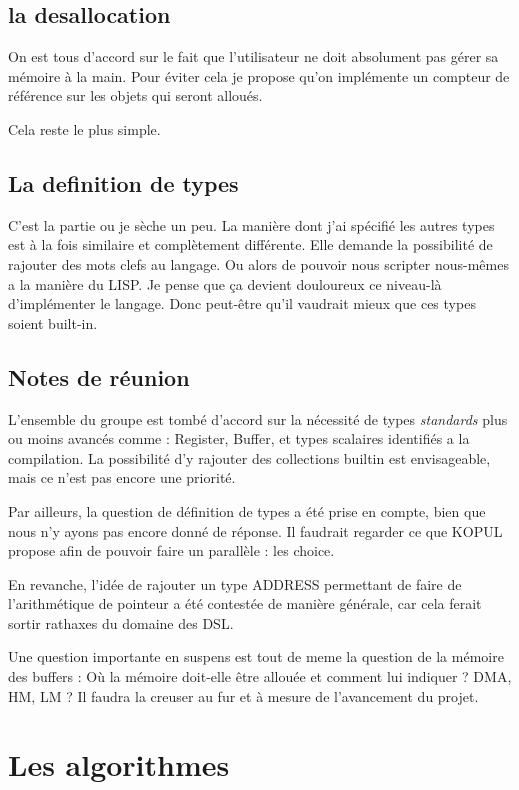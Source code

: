 \documentclass{rtxreport}
\begin{document}
\section{la desallocation}
On est tous d’accord sur le fait que l’utilisateur ne doit absolument pas gérer
sa mémoire à la main. Pour éviter cela je propose qu’on implémente un compteur
de référence sur les objets qui seront alloués.

Cela reste le plus simple.

\section{La definition de types}
C’est la partie ou je sèche un peu. La manière dont j’ai spécifié les autres
types est à la fois similaire et complètement différente. Elle demande la
possibilité de rajouter des mots clefs au langage. Ou alors de pouvoir nous
scripter nous-mêmes a la manière du LISP. Je pense que ça devient douloureux
ce niveau-là d’implémenter le langage. Donc peut-être qu’il vaudrait mieux que
ces types soient built-in.

\section{Notes de réunion}
L'ensemble du groupe est tombé d'accord sur la nécessité de types
\emph{standards} plus ou moins avancés comme : Register, Buffer, et types
scalaires identifiés a la compilation.
La possibilité d'y rajouter des collections builtin est envisageable, mais ce
n'est pas encore une priorité.

Par ailleurs, la question de définition de types a été prise en compte,
bien que nous n'y ayons pas encore donné de réponse. Il faudrait regarder ce
que KOPUL propose afin de pouvoir faire un parallèle : les choice.

En revanche, l'idée de rajouter un type ADDRESS permettant de faire de
l'arithmétique de pointeur a été contestée de manière générale, car cela ferait
sortir rathaxes du domaine des DSL.

Une question importante en suspens est tout de meme la question de la mémoire
des buffers : Où la mémoire doit-elle être allouée et comment lui indiquer ?
DMA, HM, LM ? Il faudra la creuser au fur et à mesure de l'avancement du
projet.



\chapter{Les algorithmes}
\end{document}
